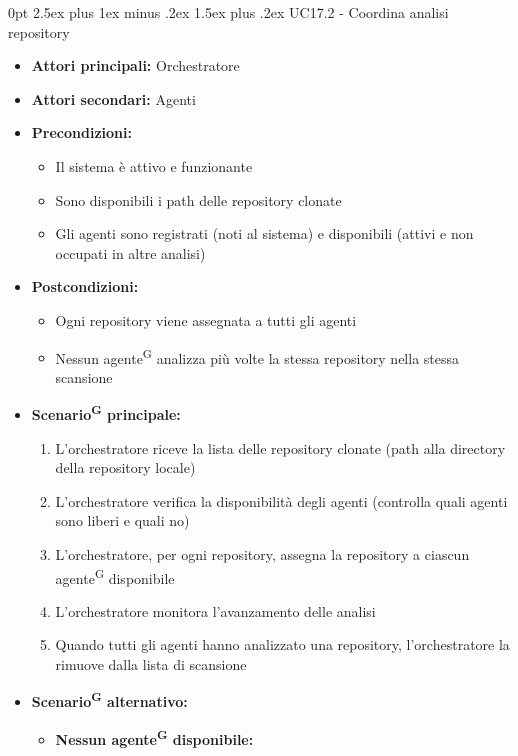 \documentclass[a4paper, 11pt]{article}
\makeatletter
\renewcommand\paragraph{\@startsection{paragraph}{4}
  {0pt}
  {2.5ex plus 1ex minus .2ex}
  {1.5ex plus .2ex}
  {\normalfont\normalsize\bfseries\color{AccentDark}}}
\makeatother
\begin{document}
\paragraph{UC17.2 - Coordina analisi repository} \label{UC17.2}
\begin{itemize}
	\item \textbf{Attori principali:} Orchestratore
	\item \textbf{Attori secondari:} Agenti
	\item \textbf{Precondizioni:}
	\begin{itemize}
		\item Il sistema è attivo e funzionante
		\item Sono disponibili i path delle repository clonate
		\item Gli agenti sono registrati (noti al sistema) e disponibili (attivi e non occupati in altre analisi)
	\end{itemize}
	\item \textbf{Postcondizioni:} 
	\begin{itemize}
		\item Ogni repository viene assegnata a tutti gli agenti
		\item Nessun agente\textsuperscript{G} analizza più volte la stessa repository nella stessa scansione
	\end{itemize}
	\item \textbf{Scenario\textsuperscript{G} principale:}
	\begin{enumerate}
		\item L'orchestratore riceve la lista delle repository clonate (path alla directory della repository locale)
		\item L'orchestratore verifica la disponibilità degli agenti (controlla quali agenti sono liberi e quali no)
		\item L'orchestratore, per ogni repository, assegna la repository a ciascun agente\textsuperscript{G} disponibile
		\item L'orchestratore monitora l'avanzamento delle analisi
		\item Quando tutti gli agenti hanno analizzato una repository, l'orchestratore la rimuove dalla lista di scansione
	\end{enumerate}
	\item \textbf{Scenario\textsuperscript{G} alternativo:}
	\begin{itemize}
		\item \textbf{Nessun agente\textsuperscript{G} disponibile:} 
			\begin{itemize}

\end{itemize}
\end{itemize}
\end{itemize}
\end{document}
